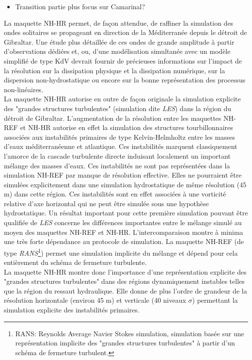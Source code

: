 \begin{itemize}
\item Transition partie plus focus sur Camarinal?
\end{itemize}


La maquette NH-HR permet, de façon attendue, de raffiner la simulation des ondes solitaires se propageant en direction de la Méditerranée depuis le détroit de Gibraltar. Une étude plus détaillée de ces ondes de grande amplitude à partir d'observations dédiées et, ou, d'une modélisation simultanée avec un modèle simplifié de type KdV devrait fournir de précieuses informations sur l'impact de la résolution sur la dissipation physique et la dissipation numérique, sur la dispersion non-hydrostatique ou encore sur la bonne représentation des processus non-linéaires.\\
La maquette  NH-HR autorise en outre de façon originale la simulation explicite des "grandes structures turbulentes" (simulation dite \textit{LES}) dans la région du détroit de Gibraltar. L'augmentation de la résolution entre les maquettes NH-REF et NH-HR autorise en effet la simulation des structures tourbillonnaires associées aux instabilités primaires de type Kelvin-Helmholtz entre les masses d'eaux méditerranéenne et atlantique. Ces instabilités marquent classiquement l'amorce de la cascade turbulente directe induisant localement un important mélange des masses d'eaux. Ces instabilités ne sont pas représentées dans la simulation NH-REF par manque de résolution effective. Elles ne pourraient être simulées explicitement dans une simulation hydrostatique de même résolution (45 m) dans cette région. Ces instabilités sont en effet associées à une vorticité relative d'axe horizontal qui ne peut être simulée sous une hypothèse hydrostatique. Un résultat important pour cette première simulation pouvant être qualifiée de \textit{LES} concerne les différences importantes entre le mélange simulé au moyen des maquettes NH-REF et NH-HR. L'intercomparaison montre à minima une très forte dépendance au protocole de simulation. La maquette NH-REF (de type \textit{RANS}\footnote{RANS: Reynolds Average Navier Stokes simulation, simulation basée sur une représentation implicite des "grandes structures turbulentes" à partir d'un schéma de fermeture turbulent.}) permet une simulation implicite du mélange et dépend pour cela entièrement du schéma de fermeture turbulente.\\
La maquette NH-HR montre donc l'importance d'une représentation explicite des "grandes structures turbulentes" dans des régions dynamiquement instables telles que la région du ressaut hydraulique. Elle donne de plus l'ordre de grandeur de la résolution horizontale (environ 45 m) et verticale (40 niveaux $\sigma$) permettant la simulation explicite des instabilités primaires.\\
